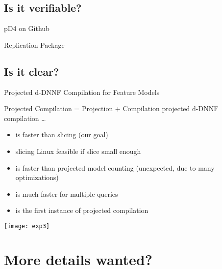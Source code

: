 \documentclass[
	aspectratio=169, %
	8pt, %
]{beamer}
\begin{document}
\subsection{Is it verifiable?}
\begin{frame}{\insertsubsection}
	\begin{fancycolumns}
		\begin{notetight}{pD4 on Github}
			\centering{}
		\end{notetight}
	\nextcolumn
		\begin{notetight}{Replication Package}
			\centering{}			
		\end{notetight}
	\end{fancycolumns}
\end{frame}

\subsection{Is it clear?}
\begin{frame}{\insertsubsection\hfill{}Projected d-DNNF Compilation for Feature Models}
	\pic[width=\linewidth,trim={0\width} {.5\height} {0\width} {.25\height},clip,page=13]{pD4}
	\begin{fancycolumns}[widths={52}]
		\begin{note}{Projected Compilation = Projection + Compilation}
			projected d-DNNF compilation \ldots
			\begin{itemize}
				\item is faster than slicing (our  goal)
				\item slicing Linux feasible if slice small enough
				\item is faster than projected model counting (unexpected, due to many optimizations)
				\item is much faster for multiple queries
				\item is the first instance of projected compilation
			\end{itemize}
		\end{note}
		\nextcolumn
		\texttt{[image: exp3]}		
	\end{fancycolumns}
\end{frame}

\againtitle

\section{More details wanted?}
\end{document}
